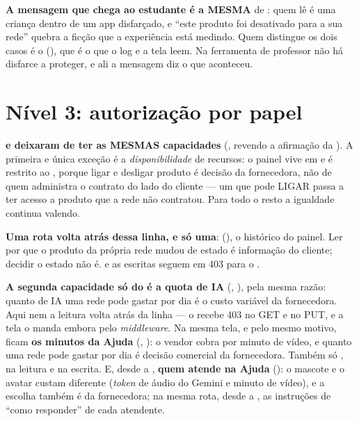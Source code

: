 \textbf{A mensagem que chega ao estudante é a MESMA} de :
quem lê é uma criança dentro de um app disfarçado, e \enquote{este produto foi
desativado para a sua rede} quebra a ficção que a experiência está medindo. Quem
distingue os dois casos é o  (), que é o que
o log e a tela leem. Na ferramenta de professor não há disfarce a proteger, e ali
a mensagem diz o que aconteceu.

\section{Nível 3: autorização por papel}

\begin{regra}
\textbf{ e  deixaram de ter as MESMAS
capacidades} (, revendo a afirmação da ). A primeira e
única exceção é a \emph{disponibilidade} de recursos: o painel vive em
 e é restrito ao , porque ligar e desligar produto é
decisão da fornecedora, não de quem administra o contrato do lado do cliente ---
um  que pode LIGAR passa a ter acesso a produto que a rede
não contratou. Para todo o resto a igualdade continua valendo.

\textbf{Uma rota volta atrás dessa linha, e só uma}:
 (), o histórico do painel. Ler por
que o produto da própria rede mudou de estado é informação do cliente; decidir o
estado não é.  e as escritas seguem em 403 para o
.

\textbf{A segunda capacidade só do  é a quota de IA}
(, ), pela mesma razão: quanto de
IA uma rede pode gastar por dia é o custo variável da fornecedora. Aqui nem a
leitura volta atrás da linha --- o  recebe 403 no GET e no
PUT, e a tela  o manda embora pelo \emph{middleware}.
Na mesma tela, e pelo mesmo motivo, ficam \textbf{os minutos da Ajuda}
(, ): o vendor cobra
por minuto de vídeo, e quanto uma rede pode gastar por dia é decisão comercial
da fornecedora. Também só , na leitura e na escrita. E, desde a
, \textbf{quem atende na Ajuda}
(): o mascote e o avatar custam diferente
(\emph{token} de áudio do Gemini e minuto de vídeo), e a escolha também é da
fornecedora; na mesma rota, desde a , as instruções de
\enquote{como responder} de cada atendente.


\end{regra}
